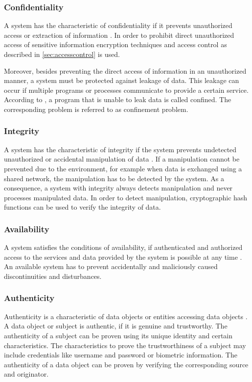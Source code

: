 \subsubsection{Confidentiality}
A system has the characteristic of confidentiality if it prevents unauthorized access or extraction of information \cite{Eckert2023}.
In order to prohibit direct unauthorized access of sensitive information encryption techniques and access control as described in \autoref{sec:accesscontrol} is used.

Moreover, besides preventing the direct access of information in an unauthorized manner, a system must be protected against leakage of data.
This leakage can occur if multiple programs or processes communicate to provide a certain service.
According to \citeauthor{Lampson1973} \cite{Lampson1973}, a program that is unable to leak data is called confined.
The corresponding problem is referred to as confinement problem.

\subsubsection{Integrity}
A system has the characteristic of integrity if the system prevents undetected unauthorized or accidental manipulation of data \cite{Eckert2023}.
If a manipulation cannot be prevented due to the environment, for example when data is exchanged using a shared network, the manipulation has to be detected by the system.
As a consequence, a system with integrity always detects manipulation and never processes manipulated data.
In order to detect manipulation, cryptographic hash functions can be used to verify the integrity of data.

\subsubsection{Availability}
A system satisfies the conditions of availability, if authenticated and authorized access to the services and data provided by the system is possible at any time \cite{Eckert2023}.
An available system has to prevent accidentally and maliciously caused discontinuities and disturbances.

\subsubsection{Authenticity}
Authenticity is a characteristic of data objects or entities accessing data objects \cite{Eckert2023}.
A data object or subject is authentic, if it is genuine and trustworthy.
The authenticity of a subject can be proven using its unique identity and certain characteristics.
The characteristics to prove the trustworthiness of a subject may include credentials like username and password or biometric information.
The authenticity of a data object can be proven by verifying the corresponding source and originator.

